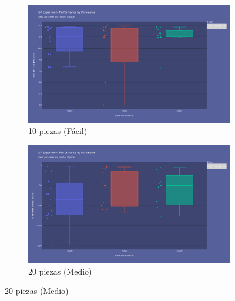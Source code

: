 \documentclass[11pt,spanish,listoffigures,listoftables]{tfgetsinf}
\begin{document}
\begin{figure}[H]
    \centering
    \begin{subfigure}[b]{0.48\textwidth}
        \centering
        \includegraphics[width=\textwidth]{images/GA_np-10_population.png}
        \caption{10 piezas (Fácil)}
        \label{fig:ga_np10_population}
    \end{subfigure}
    \hfill
    \begin{subfigure}[b]{0.48\textwidth}
        \centering
        \includegraphics[width=\textwidth]{images/GA_np-20_population.png}
        \caption{20 piezas (Medio)}
        \label{fig:ga_np20_population}
    \end{subfigure}
    
    \vspace{0.5cm}
    

\end{figure}
\end{document}
